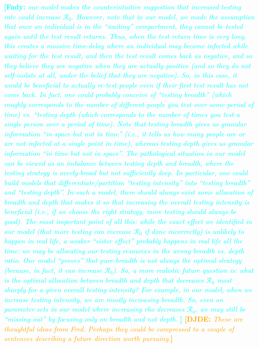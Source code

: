 \documentclass[12pt]{article}
\newcommand{\comment}{\showcomment}
\newcommand{\showcomment}[3]{\textcolor{#1}{\textbf{[#2: }\textsl{#3}\textbf{]}}}
\newcommand{\Rnum}{\ensuremath{\mathcal{R}_0}\xspace}
\DeclareRobustCommand\_{\ifmmode\expandafter\subtxt\else\textunderscore\fi}
\newcommand{\fady}[1]{\comment{cyan}{Fady}{#1}}
\newcommand{\david}[1]{\comment{orange}{DJDE}{#1}}
\begin{document}
\fady{
our model makes the counterintuitive suggestion that increased testing rate could increase $\Rnum$. However, note that in our model, we made the assumption that once an individual is in the ``waiting'' compartment, they cannot be tested again until the test result returns. Thus, when the test return time is very long, this creates a massive time-delay where an individual may become infected while waiting for the test result, and then the test result comes back as negative, and so they believe they are negative when they are actually positive (and so they do not self-isolate at all, under the belief that they are negative).
So, in this case, it would be beneficial to actually re-test people even if their first test result has not come back. In fact, one could probably conceive of ``testing breadth'' (which roughly corresponds to the number of different people you test over some period of time) vs. ``testing depth (which corresponds to the number of times you test a single person over a period of time). Note that testing breadth gives us granular information ``in space but not in time'' (i.e., it tells us how many people are or are not infected at a single point in time), whereas testing depth gives us granular information ``in time but not in space''. The pathological situation in our model can be viewed as an imbalance between testing depth and breadth, where the testing strategy is overly-broad but not sufficiently deep.
In particular, one could build models that differentiate/partition ``testing intensity'' into ``testing breadth'' and ``testing depth''. In such a model, there should always exist some allocation of breadth and depth that makes it so that increasing the overall testing intensity is beneficial (i.e., if we choose the right strategy, more testing should always be good).
The most important point of all this: while the exact effect we identified in our model (that more testing can increase $\Rnum$ if done incorrectly) is unlikely to happen in real life, a weaker ``sister effect'' probably happens in real life all the time: we may be allocating our testing resources in the wrong breadth vs. depth ratio. Our model ``proves'' that pure-breadth is not always the optimal strategy (because, in fact, it can increase $\Rnum$). So, a more realistic future question is: what is the optimal allocation between breadth and depth that decreases $\Rnum$ most sharply for a given overall testing intensity? For example, in our model, when we increase testing intensity, we are mostly increasing breadth. So, even on parameter sets in our model where increasing rho decreases $\Rnum$, we may still be ``missing out'' by focusing only on breadth and not depth.
}
\david{These are thoughtful ideas from Fred.  Perhaps they could be compressed to a couple of sentences describing a future direction worth pursuing.}
\end{document}
